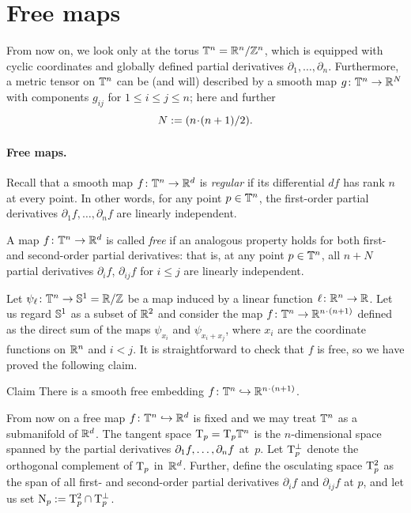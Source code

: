 \section{Free maps}\label{sec:free}

From now on, we look only at the torus $\TT^n\z=\RR^n/\ZZ^n$, which is equipped with cyclic coordinates and globally defined partial derivatives $\partial_1,\dots,\partial_n$.
Furthermore, a metric tensor on $\mathbb{T}^n$ can be (and will) described by a smooth map $g\colon\mathbb{T}^n\to\mathbb{R}^N$ with components $g_{ij}$ for $1\le i\le j\le n$; here and further \label{Nn}
\[N\df\tfrac{n\cdot(n+1)}2.\]

\paragraph{Free maps.}
Recall that a smooth map $f\colon\mathbb{T}^n \to \mathbb{R}^d$ is \emph{regular} if its differential $df$ has rank $n$ at every point.
In other words, for any point $p\in \mathbb{T}^n$, the first-order partial derivatives $\partial_1 f,\dots,\partial_n f$ are linearly independent.

A map $f\colon\mathbb{T}^n \to \mathbb{R}^d$ is called \emph{free} if an analogous property holds for both first- and second-order partial derivatives:
that is, at any point $p\in \mathbb{T}^n$, all $n + N$ partial derivatives
$\partial_i f$,
$\partial_{ij}f$ for $i\le j$
are linearly independent.

Let $\psi_\ell\colon\mathbb{T}^n\to\mathbb{S}^1=\mathbb{R}/\mathbb{Z}$ be a map induced by a linear function $\ell\colon\mathbb{R}^n\to\mathbb{R}$.
Let us regard $\mathbb{S}^1$ as a subset of $\mathbb{R}^2$ and consider the map $f\colon\TT^n\z\to \RR^{n\cdot(n+1)}$
defined as the direct sum of the maps
$\psi_{x_i}$ and $\psi_{x_i+x_j}$, where $x_i$ are the coordinate functions on $\mathbb{R}^n$ and $i<j$.
It is straightforward to check that $f$ is free, so we have proved the following claim.

\begin{thm}{Claim}\label{ex:free-composition}
There is a smooth free embedding $f\colon\TT^n\hookrightarrow \RR^{n\cdot(n+1)}$.
\end{thm}

From now on a free map $f\colon\mathbb{T}^n\hookrightarrow \mathbb{R}^d$\label{f} is fixed and we may treat $\mathbb{T}^n$ as a submanifold of $\mathbb{R}^d$.
The tangent space $\mathrm{T}_p=\mathrm{T}_p\mathbb{T}^n$ is the $n$-dimensional space spanned by the partial derivatives $\partial_1f,\z\dots, \partial_nf$ at~$p$.
Let $\mathrm{T}_p^\perp$ denote the orthogonal complement of $\mathrm{T}_p$ in~$\mathbb{R}^d$.
Further, define the osculating space $\mathrm{T}^2_p$ as the span of all first- and second-order partial derivatives $\partial_i f$ and $\partial_{ij} f$ at $p$, and let us set $\N_p \z\df \T^2_p \cap \T_p^\perp$.

